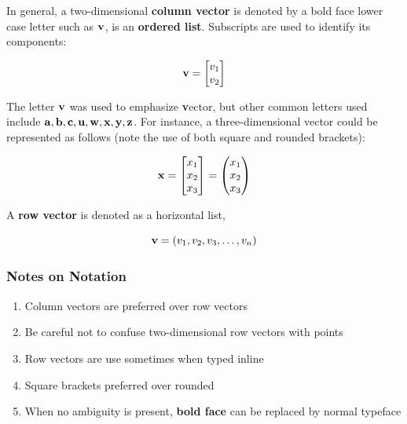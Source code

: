 In general, a two-dimensional  {\color{blue}\textbf{column vector}} is denoted by a bold face lower case letter such as ${\bf v}$, is an \textbf{ordered list}.  Subscripts are used to identify its components: 

\[  {\bf v} = \begin{bmatrix}
	v_1\\v_2
	\end{bmatrix}
\]


The letter ${\bf v}$ was used to emphasize \textbf{v}ector, but other common letters used include ${\bf a, b, c, u, w, x, y, z}$.  For instance,  a three-dimensional vector could be represented as follows (note the use of both square and rounded brackets): 


\[  {\bf x} = \begin{bmatrix}
	x_1\\x_2\\x_3
	\end{bmatrix} = \begin{pmatrix}
	x_1\\x_2\\x_3
	\end{pmatrix}
\]


A \textbf{row vector} is denoted as a horizontal list, 

\[  {\bf v} = (v_1 , v_2, v_3, \dots, v_n) \]

 

\subsubsection*{Notes on Notation}
\begin{enumerate}
	\item Column vectors are preferred over row vectors
	\item Be careful  not to confuse two-dimensional row vectors with points 
	\item Row vectors are use sometimes when typed inline
	\item Square brackets preferred over rounded
	\item When no ambiguity is present, \textbf{bold face} can be replaced by normal typeface
\end{enumerate}



